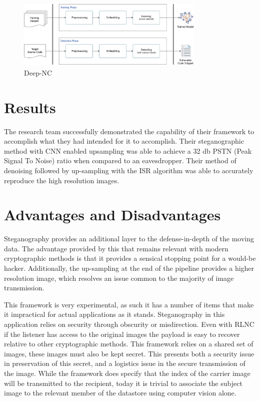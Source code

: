 \documentclass[]{article}
\begin{document}
\begin{figure}[h]
	\centering
	\includegraphics[width=0.8\textwidth]{Algorithm}
	\caption{Deep-NC \cite{Vien2021}}
\end{figure}

\section{Results}

The research team successfully demonstrated the capability of their framework to accomplish what they had intended for it to accomplish. 
Their steganographic method with CNN enabled upsampling was able to achieve a 32 db PSTN (Peak Signal To Noise) ratio when compared to an eavesdropper.
Their method of denoising followed by up-sampling with the ISR algorithm was able to accurately reproduce the high resolution images.


\section{Advantages and Disadvantages}

Steganography provides an additional layer to the defense-in-depth of the moving data. 
The advantage provided by this that remains relevant with modern cryptographic methods is that it provides a sensical stopping point for a would-be hacker.
Additionally, the up-sampling at the end of the pipeline provides a higher resolution image, which resolves an issue common to the majority of image transmission.

This framework is very experimental, as such it has a number of items that make it impractical for actual applications as it stands.
Steganography in this application relies on security through obscurity or misdirection.
Even with RLNC if the listener has access to the original images the payload is easy to recover relative to other cryptographic methods. 
This framework relies on a shared set of images, these images must also be kept secret.
This presents both a security issue in preservation of this secret, 
and a logistics issue in the secure transmission of the image.
While the framework does specify that the index of the carrier image will be transmitted to the recipient, today it is trivial to associate the subject image to the relevant member of the datastore using computer vision alone.
\end{document}

